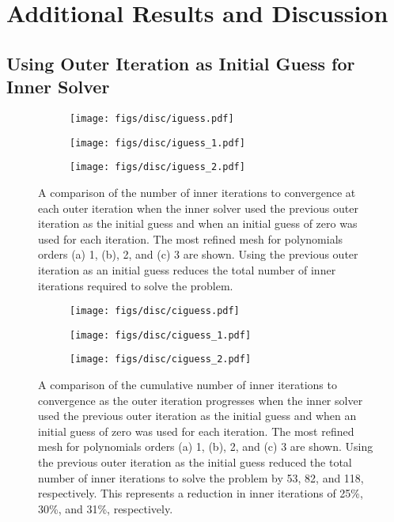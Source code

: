 \documentclass[../doc.tex]{subfiles}
\begin{document}
\chapter{Additional Results and Discussion}
\section{Using Outer Iteration as Initial Guess for Inner Solver}
\begin{figure}
\centering 
\begin{subfigure}{.32\textwidth}
	\centering
	\texttt{[image: figs/disc/iguess.pdf]}
	\caption{}
\end{subfigure}
\begin{subfigure}{.32\textwidth}
	\centering
	\texttt{[image: figs/disc/iguess\_1.pdf]}
	\caption{}
\end{subfigure}
\begin{subfigure}{.32\textwidth}
	\centering
	\texttt{[image: figs/disc/iguess\_2.pdf]}
	\caption{}
\end{subfigure}
\caption{A comparison of the number of inner iterations to convergence at each outer iteration when the inner solver used the previous outer iteration as the initial guess and when an initial guess of zero was used for each iteration. The most refined mesh for polynomials orders (a) 1, (b), 2, and (c) 3 are shown. Using the previous outer iteration as an initial guess reduces the total number of inner iterations required to solve the problem.}
\label{disc:iguess}
\end{figure}

\begin{figure}
\centering 
\begin{subfigure}{.32\textwidth}
	\centering
	\texttt{[image: figs/disc/ciguess.pdf]}
	\caption{}
\end{subfigure}
\begin{subfigure}{.32\textwidth}
	\centering
	\texttt{[image: figs/disc/ciguess\_1.pdf]}
	\caption{}
\end{subfigure}
\begin{subfigure}{.32\textwidth}
	\centering
	\texttt{[image: figs/disc/ciguess\_2.pdf]}
	\caption{}
\end{subfigure}
\caption{A comparison of the cumulative number of inner iterations to convergence as the outer iteration progresses when the inner solver used the previous outer iteration as the initial guess and when an initial guess of zero was used for each iteration. The most refined mesh for polynomials orders (a) 1, (b), 2, and (c) 3 are shown. Using the previous outer iteration as the initial guess reduced the total number of inner iterations to solve the problem by 53, 82, and 118, respectively. This represents a reduction in inner iterations of 25\%, 30\%, and 31\%, respectively.}
\label{disc:ciguess}
\end{figure}
\end{document}
